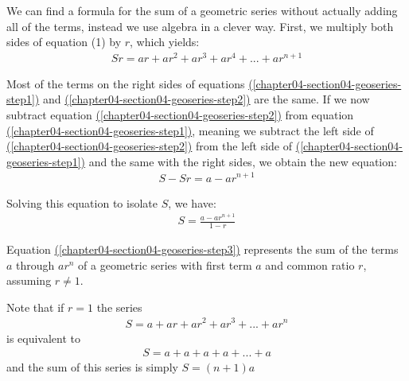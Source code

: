 \documentclass[10pt,]{book}
\theoremstyle{ptxdefinitionnotitle}
\theoremstyle{ptxdefinitiontitle}
\theoremstyle{ptxdefinitionnotitle}
\theoremstyle{ptxdefinitiontitle}
\theoremstyle{ptxdefinitionnotitle}
\theoremstyle{ptxdefinitiontitle}
\numberwithin{equation}{section}
\begin{document}
\par
\hypertarget{p-143}{}%
We can find a formula for the sum of a geometric series without actually adding all of the terms, instead we use algebra in a clever way.  First, we multiply both sides of equation (1) by \(r\), which yields:%
\begin{gather}
Sr = ar + ar^2 + ar^3 + ar^4 + ... + ar^{n+1}\label{chapter04-section04-geoseries-step2}
\end{gather}
%
\par
\hypertarget{p-144}{}%
Most of the terms on the right sides of equations \hyperref[chapter04-section04-geoseries-step1]{(\ref{chapter04-section04-geoseries-step1})} and \hyperref[chapter04-section04-geoseries-step2]{(\ref{chapter04-section04-geoseries-step2})} are the same.  If we now subtract equation \hyperref[chapter04-section04-geoseries-step2]{(\ref{chapter04-section04-geoseries-step2})} from equation \hyperref[chapter04-section04-geoseries-step1]{(\ref{chapter04-section04-geoseries-step1})}, meaning we subtract the left side of \hyperref[chapter04-section04-geoseries-step2]{(\ref{chapter04-section04-geoseries-step2})} from the left side of \hyperref[chapter04-section04-geoseries-step1]{(\ref{chapter04-section04-geoseries-step1})} and the same with the right sides, we obtain the new equation:%
\begin{gather*}
S-Sr = a - ar^{n+1}
\end{gather*}
%
\par
\hypertarget{p-145}{}%
Solving this equation to isolate \(S\), we have:%
\begin{gather}
S = \frac{a-ar^{n+1}}{1-r}\label{chapter04-section04-geoseries-step3}
\end{gather}
%
\par
\hypertarget{p-146}{}%
Equation \hyperref[chapter04-section04-geoseries-step3]{(\ref{chapter04-section04-geoseries-step3})} represents the sum of the terms \(a\) through \(ar^n\) of a geometric series with first term \(a\) and common ratio \(r\), assuming \(r \neq 1\).%
\par
\hypertarget{p-147}{}%
Note that if \(r=1\) the series%
\begin{gather*}
S = a + ar + ar^2 + ar^3 + ... + ar^n
\end{gather*}
is equivalent to%
\begin{gather*}
S = a + a + a + a + ... + a
\end{gather*}
and the sum of this series is simply \(S=(n+1)a\)%
\par
\hypertarget{p-148}{}%
\end{document}
